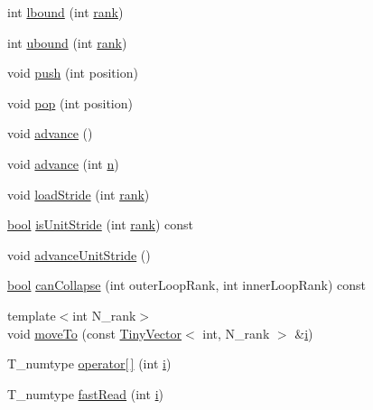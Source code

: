 \begin{DoxyCompactItemize}
\item 
int \hyperlink{class__bz__ArrayWhere_ae4eadda51b38dc1f759ab793b360522a}{lbound} (int \hyperlink{class__bz__ArrayWhere_ad72a01a0949053944abf6f1e4da15f67}{rank})
\item 
int \hyperlink{class__bz__ArrayWhere_a39e94ac4a73ebbe567848df7caa4b59e}{ubound} (int \hyperlink{class__bz__ArrayWhere_ad72a01a0949053944abf6f1e4da15f67}{rank})
\item 
void \hyperlink{class__bz__ArrayWhere_a9f9d9a221c314ef0002c8acbe659f37c}{push} (int position)
\item 
void \hyperlink{class__bz__ArrayWhere_a3ea7de550120a433da002f74f86b2cda}{pop} (int position)
\item 
void \hyperlink{class__bz__ArrayWhere_acfa809007d71b8186df16feb9e739378}{advance} ()
\item 
void \hyperlink{class__bz__ArrayWhere_ae6d3cf52edac4658b40a1cd65eab347c}{advance} (int \hyperlink{indexexpr_8h_ab427e2e2b4d6cec55fa088ea2a692ace}{n})
\item 
void \hyperlink{class__bz__ArrayWhere_aeca763b4dab42e1bcd822860d2c75729}{load\+Stride} (int \hyperlink{class__bz__ArrayWhere_ad72a01a0949053944abf6f1e4da15f67}{rank})
\item 
\hyperlink{compiler_8h_abb452686968e48b67397da5f97445f5b}{bool} \hyperlink{class__bz__ArrayWhere_a426157771197e6d037fb800960a32ace}{is\+Unit\+Stride} (int \hyperlink{class__bz__ArrayWhere_ad72a01a0949053944abf6f1e4da15f67}{rank}) const 
\item 
void \hyperlink{class__bz__ArrayWhere_aed4163fc0a5af6a7d2a15236256001b3}{advance\+Unit\+Stride} ()
\item 
\hyperlink{compiler_8h_abb452686968e48b67397da5f97445f5b}{bool} \hyperlink{class__bz__ArrayWhere_a6f4b4d2c9c867d0eaf24ad22fe372dbc}{can\+Collapse} (int outer\+Loop\+Rank, int inner\+Loop\+Rank) const 
\item 
{\footnotesize template$<$int N\+\_\+rank$>$ }\\void \hyperlink{class__bz__ArrayWhere_a6432ebcec040bd4b1ddb4acc036cdfe8}{move\+To} (const \hyperlink{classTinyVector}{Tiny\+Vector}$<$ int, N\+\_\+rank $>$ \&\hyperlink{indexexpr_8h_aabd77643995707c185e95c8cb2782c81}{i})
\item 
T\+\_\+numtype \hyperlink{class__bz__ArrayWhere_ad5ff6349d6430cd5e3d2f8cbf6c16408}{operator\mbox{[}$\,$\mbox{]}} (int \hyperlink{indexexpr_8h_aabd77643995707c185e95c8cb2782c81}{i})
\item 
T\+\_\+numtype \hyperlink{class__bz__ArrayWhere_acc06bbaff44d53b6c6573a1e11decf38}{fast\+Read} (int \hyperlink{indexexpr_8h_aabd77643995707c185e95c8cb2782c81}{i})

\end{DoxyCompactItemize}
